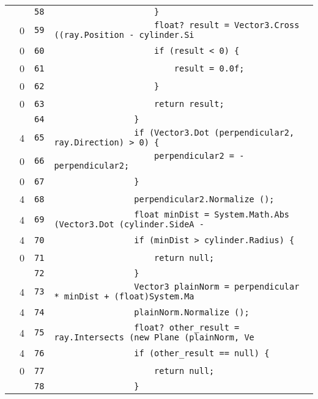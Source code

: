\documentclass[a4paper,10pt]{article}
\begin{document}
\begin{longtable}[l]{lrrl}
\cellcolor{gray} &  & \verb~58~ & \verb~                    }~\\
\cellcolor{red} & 0 & \verb~59~ & \verb~                    float? result = Vector3.Cross ((ray.Position - cylinder.Si~\\
\cellcolor{red} & 0 & \verb~60~ & \verb~                    if (result < 0) {~\\
\cellcolor{red} & 0 & \verb~61~ & \verb~                        result = 0.0f;~\\
\cellcolor{red} & 0 & \verb~62~ & \verb~                    }~\\
\cellcolor{red} & 0 & \verb~63~ & \verb~                    return result;~\\
\cellcolor{gray} &  & \verb~64~ & \verb~                }~\\
\cellcolor{green} & 4 & \verb~65~ & \verb~                if (Vector3.Dot (perpendicular2, ray.Direction) > 0) {~\\
\cellcolor{red} & 0 & \verb~66~ & \verb~                    perpendicular2 = -perpendicular2;~\\
\cellcolor{red} & 0 & \verb~67~ & \verb~                }~\\
\cellcolor{green} & 4 & \verb~68~ & \verb~                perpendicular2.Normalize ();~\\
\cellcolor{green} & 4 & \verb~69~ & \verb~                float minDist = System.Math.Abs (Vector3.Dot (cylinder.SideA -~\\
\cellcolor{green} & 4 & \verb~70~ & \verb~                if (minDist > cylinder.Radius) {~\\
\cellcolor{red} & 0 & \verb~71~ & \verb~                    return null;~\\
\cellcolor{gray} &  & \verb~72~ & \verb~                }~\\
\cellcolor{green} & 4 & \verb~73~ & \verb~                Vector3 plainNorm = perpendicular * minDist + (float)System.Ma~\\
\cellcolor{green} & 4 & \verb~74~ & \verb~                plainNorm.Normalize ();~\\
\cellcolor{green} & 4 & \verb~75~ & \verb~                float? other_result = ray.Intersects (new Plane (plainNorm, Ve~\\
\cellcolor{green} & 4 & \verb~76~ & \verb~                if (other_result == null) {~\\
\cellcolor{red} & 0 & \verb~77~ & \verb~                    return null;~\\
\cellcolor{gray} &  & \verb~78~ & \verb~                }~\\

\end{longtable}
\end{document}
